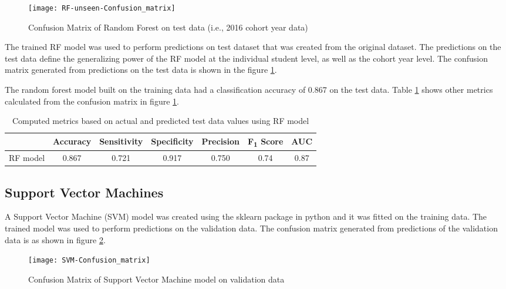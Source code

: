 \documentclass[11pt,openright]{report}
\begin{document}
  \begin{figure}[!htb]
	\centering
	\texttt{[image: RF-unseen-Confusion\_matrix]}
	\caption{Confusion Matrix of Random Forest on test data (i.e., 2016 cohort year data)}
	\label{fig:RF_unseen_confusion_matrix}
\end{figure} 

The trained RF model was used to perform predictions on test dataset that was created from the original dataset. The predictions on the test data define the generalizing power of the RF model at the individual student level, as well as the cohort year level. The confusion matrix generated from predictions on the test data is shown in the figure \ref{fig:RF_unseen_confusion_matrix}.

The random forest model built on the training data had a classification accuracy of 0.867 on the test data. Table \ref{table:RF-unseen_metrics_db} shows other metrics calculated from the confusion matrix in figure \ref{fig:RF_unseen_confusion_matrix}.

\begin{table}[!htb]
	\renewcommand{\arraystretch}{1.3}
	\caption{Computed metrics based on actual and predicted test data values using RF model}
	\label{table:RF-unseen_metrics_db}
	\centering
	\begin{tabular}{|c|c|c|c|c|c|c|}
    \hline
  	 & \bfseries Accuracy & \bfseries Sensitivity & \bfseries Specificity & \bfseries Precision & \bfseries F\textsubscript{1} Score  & \bfseries AUC\\  
    \hline
	RF model & 0.867 & 0.721 & 0.917 & 0.750 & 0.74 & 0.87 \\ \hline
	\end{tabular} 
\end{table}


\subsection {Support Vector Machines}
A Support Vector Machine (SVM) model was created using the sklearn package in python and it was fitted on the training data. The trained model was used to perform predictions on the validation data. The confusion matrix generated from predictions of the validation data is as shown in figure \ref{fig:SVM_confusion_matrix}.

  \begin{figure}[!htb]
	\centering
	\texttt{[image: SVM-Confusion\_matrix]}
	\caption{Confusion Matrix of Support Vector Machine model on validation data}
	\label{fig:SVM_confusion_matrix}
\end{figure} 
\end{document}
